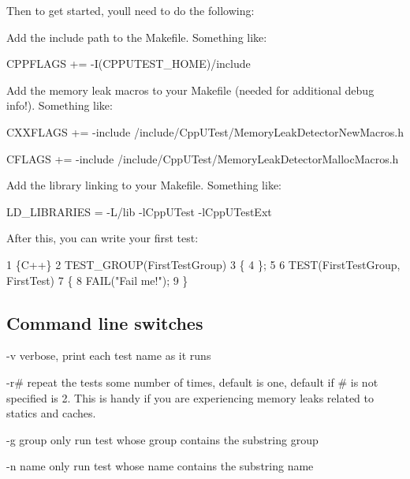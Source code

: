 Then to get started, you\textquotesingle{}ll need to do the following\+:
\begin{DoxyItemize}
\item Add the include path to the Makefile. Something like\+:
\begin{DoxyItemize}
\item C\+P\+P\+F\+L\+A\+GS += -\/I(C\+P\+P\+U\+T\+E\+S\+T\+\_\+\+H\+O\+ME)/include
\end{DoxyItemize}
\item Add the memory leak macros to your Makefile (needed for additional debug info!). Something like\+:
\begin{DoxyItemize}
\item C\+X\+X\+F\+L\+A\+GS += -\/include /include/\+Cpp\+U\+Test/\+Memory\+Leak\+Detector\+New\+Macros.h
\item C\+F\+L\+A\+GS += -\/include /include/\+Cpp\+U\+Test/\+Memory\+Leak\+Detector\+Malloc\+Macros.h
\end{DoxyItemize}
\item Add the library linking to your Makefile. Something like\+:
\begin{DoxyItemize}
\item L\+D\+\_\+\+L\+I\+B\+R\+A\+R\+I\+ES = -\/L/lib -\/l\+Cpp\+U\+Test -\/l\+Cpp\+U\+Test\+Ext
\end{DoxyItemize}
\end{DoxyItemize}

After this, you can write your first test\+:


\begin{DoxyCode}
1 \{C++\}
2 TEST\_GROUP(FirstTestGroup)
3 \{
4 \};
5 
6 TEST(FirstTestGroup, FirstTest)
7 \{
8    FAIL("Fail me!");
9 \}
\end{DoxyCode}


\subsection*{Command line switches}


\begin{DoxyItemize}
\item -\/v verbose, print each test name as it runs
\item -\/r\# repeat the tests some number of times, default is one, default if \# is not specified is 2. This is handy if you are experiencing memory leaks related to statics and caches.
\item -\/g group only run test whose group contains the substring group
\item -\/n name only run test whose name contains the substring name
\end{DoxyItemize}

